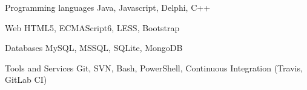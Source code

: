 

\begin{cvskills}

  \cvskill
    {Programming languages} %
    {Java, Javascript, Delphi, C++} %

  \cvskill
    {Web} %
    {HTML5, ECMAScript6, LESS, Bootstrap} %

  \cvskill
    {Databases} %
    {MySQL, MSSQL, SQLite, MongoDB} %

  \cvskill
    {Tools and Services} %
    {Git, SVN, Bash, PowerShell, Continuous Integration (Travis, GitLab CI)} %

\end{cvskills}
